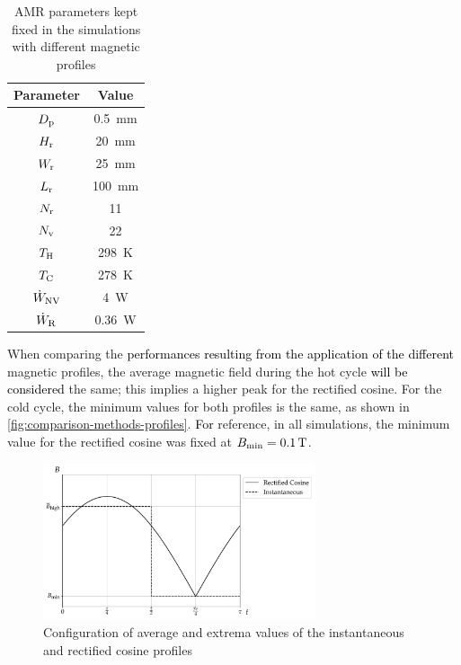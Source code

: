\documentclass[referee]{svjour3}
\begin{document}
\begin{table}[!ht]
  \centering
  \caption{AMR parameters kept fixed in the simulations with different magnetic profiles}
  \begin{tabular}{c|c}
\hline
\textbf{Parameter} & \textbf{Value}\\
\hline
   $D_{\mathrm{p}}$ & \SI{0.5}{\mm}\\
$H_{\mathrm{r}}$ & \SI{20}{\mm}\\
$W_{\mathrm{r}}$ & \SI{25}{\mm}\\
$L_{\mathrm{r}}$ & \SI{100}{\mm}\\
$N_{\mathrm{r}}$ & 11 \\
$N_{\mathrm{v}}$ & 22 \\
$T_{\mathrm{H}}$ & \SI{298}{\kelvin}\\
$T_{\mathrm{C}}$ & \SI{278}{\kelvin}\\
$\dot{W}_{\mathrm{NV}}$ & \SI{4}{\watt}\\
$\dot{W}_{\mathrm{R}}$ & \SI{0.36}{\watt}\\
\hline
  \end{tabular}

  \label{tab:params-cobem}
\end{table}


When comparing the \textcolor{black}{performances resulting from the application of the different} magnetic profiles, the average magnetic field during the hot cycle \textcolor{black}{will be considered} the same; this implies a higher peak for the rectified cosine. For the cold cycle,  the minimum values for both profiles is the same, as shown in \autoref{fig:comparison-methods-profiles}. \textcolor{black}{For} reference, in all simulations,  the minimum value for the rectified cosine was fixed at ${B}_{\mathrm{min}} = \SI{0.1}{\tesla}$. 

\begin{figure}[!ht]
  \centering
\includegraphics[width=8cm]{profiles_it_and_rc_same_minimum}
  \caption{Configuration of average and extrema values of the instantaneous and rectified cosine profiles }
  \label{fig:comparison-methods-profiles}
\end{figure}
\end{document}
